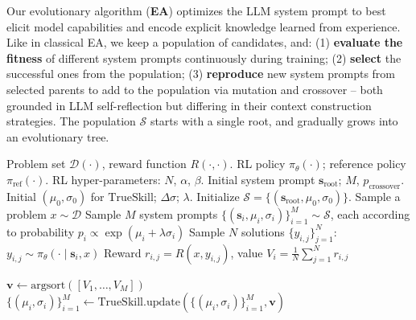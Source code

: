 \documentclass{article}
\theoremstyle{plain}
\theoremstyle{definition}
\theoremstyle{remark}
\begin{document}
Our evolutionary algorithm (\textbf{EA}) optimizes the LLM system prompt to best elicit model capabilities and encode explicit knowledge learned from experience. Like in classical EA, we keep a population of candidates, and: (1) \textbf{evaluate the fitness} of different system prompts continuously during training; (2) \textbf{select} the successful ones from the population; (3) \textbf{reproduce} new system prompts from selected parents to add to the population via mutation and crossover -- both grounded in LLM self-reflection but differing in their context construction strategies. The population $\mathcal{S}$ starts with a single {root}, and gradually grows into an evolutionary tree.

\begin{algorithm}[t]
    \caption{Evolutionary System Prompt Learning for RL}
    \label{alg:e-spl}
    \begin{algorithmic}
       Problem set $\mathcal{D}(\cdot)$, reward function $R(\cdot, \cdot)$.
       RL policy $\pi_{\theta}(\cdot)$; reference policy $\pi_{\text{ref}}(\cdot)$.
       RL hyper-parameters: $N$, $\alpha$, $\beta$.
       Initial system prompt $\mathbf{s}_{\text{root}}$; $M$, $p_{\text{crossover}}$.
       Initial $(\mu_{0}, \sigma_{0})$ for {$\mathrm{TrueSkill}$}; $\Delta\sigma$; $\lambda$.
      \STATE Initialize $\mathcal{S} = \{(\mathbf{s}_{\text{root}}, \mu_{0}, \sigma_{0})\}$. \hfill {}
      \STATE Sample a problem $x\sim \mathcal{D}$
      \STATE Sample $M$ system prompts $\{(\mathbf{s}_{i}, \mu_{i}, \sigma_{i})\}_{i=1}^{M} \sim \mathcal{S}$, each according to probability $p_{i} \propto \exp( \mu_{i} + \lambda \sigma_{i} )$
          \STATE Sample $N$ solutions $\{y_{i,j}\}_{j=1}^{N}$: $y_{i, j}\sim \pi_{\theta}(\cdot \mid \mathbf{s}_{i}, x)$
          \STATE Reward $r_{i,j} = R(x, y_{i, j})$, value {$V_{i} = \frac{1}{N} {\sum}_{j=1}^{N} r_{i,j}$}
      \ENDFOR
       \hfill {}
      \vspace{5pt}

      \STATE $\mathbf{v} \leftarrow \mathrm{argsort}([V_{1},\dots, V_{M}])$ \hfill {}
      \STATE $\{(\mu_{i}, \sigma_{i})\}_{i=1}^{M} \leftarrow {\mathrm{TrueSkill}.\mathrm{update}}(\{(\mu_{i}, \sigma_{i})\}_{i=1}^{M}, \mathbf{v})$ \hfill {}
      \vspace{5pt}


\end{algorithmic}
\end{algorithm}
\end{document}
